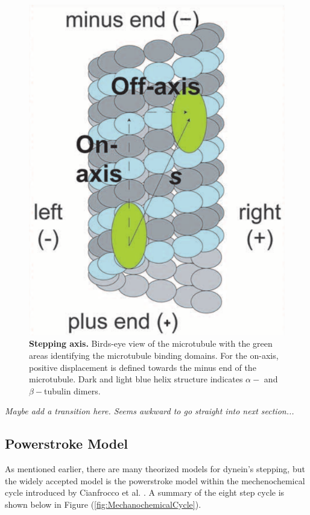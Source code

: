 \begin{figure}[H]
	\centering
	\includegraphics[width=0.3\columnwidth]{Figures/Onaxis.png}
	\caption[Stepping Axis]{\textbf{Stepping axis.} Birds-eye view of the microtubule with the green areas identifying the microtubule binding domains. For the on-axis, positive displacement is defined towards the minus end of the microtubule. Dark and light blue helix structure indicates $\alpha-$ and $\beta-$tubulin dimers. \cite{Dewitt2012} }
	\label{fig:axis}
\end{figure}

\textit{Maybe add a transition here. Seems awkward to go straight into next section...}



\subsection{Powerstroke Model}

As mentioned earlier, there are many theorized models for dynein's stepping, but the widely accepted model is the powerstroke model within the mechenochemical cycle introduced by Cianfrocco et al. \cite{Cianfrocco2015mechanism}. A summary of the eight step cycle is shown below in Figure (\ref{fig:MechanochemicalCycle}).

